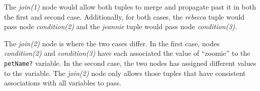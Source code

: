 The \emph{join(1)} node would allow both tuples to merge and
propagate past it in both the first and second case.  Additionally,
for both cases, the \emph{rebecca} tuple would pass node
\emph{condition(2)}
and the \emph{jeannie} tuple would pass node \emph{condition(3)}.

The \emph{join(2)} node is where the two cases differ.  In the first
case, nodes \emph{condition(2)} and \emph{condition(3)} have each associated the value
of ``zoomie'' to the \verb|petName?| variable.  In the second case, the
two nodes has assigned different values to the variable.  The
\emph{join(2)} node only allows those tuples that have consistent
associations with all variables to pass.

